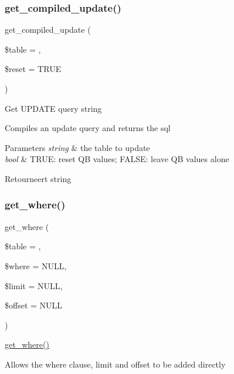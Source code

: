 \subsubsection{\texorpdfstring{get\_compiled\_update()}{get\_compiled\_update()}}
{\footnotesize\ttfamily get\+\_\+compiled\+\_\+update (\begin{DoxyParamCaption}\item[{}]{\$table = {\ttfamily \textquotesingle{}\textquotesingle{}},  }\item[{}]{\$reset = {\ttfamily TRUE} }\end{DoxyParamCaption})}

Get U\+P\+D\+A\+TE query string

Compiles an update query and returns the sql


\begin{DoxyParams}{Parameters}
{\em string} & the table to update \\
\hline
{\em bool} & T\+R\+UE\+: reset QB values; F\+A\+L\+SE\+: leave QB values alone \\
\hline
\end{DoxyParams}
\begin{DoxyReturn}{Retourneert}
string 
\end{DoxyReturn}
\mbox{\label{class_c_i___d_b__query__builder_a8cae750fdc32b3c91544c091673fd17b}} 
\subsubsection{\texorpdfstring{get\_where()}{get\_where()}}
{\footnotesize\ttfamily get\+\_\+where (\begin{DoxyParamCaption}\item[{}]{\$table = {\ttfamily \textquotesingle{}\textquotesingle{}},  }\item[{}]{\$where = {\ttfamily NULL},  }\item[{}]{\$limit = {\ttfamily NULL},  }\item[{}]{\$offset = {\ttfamily NULL} }\end{DoxyParamCaption})}

\mbox{\hyperlink{class_c_i___d_b__query__builder_a8cae750fdc32b3c91544c091673fd17b}{get\+\_\+where()}}

Allows the where clause, limit and offset to be added directly


